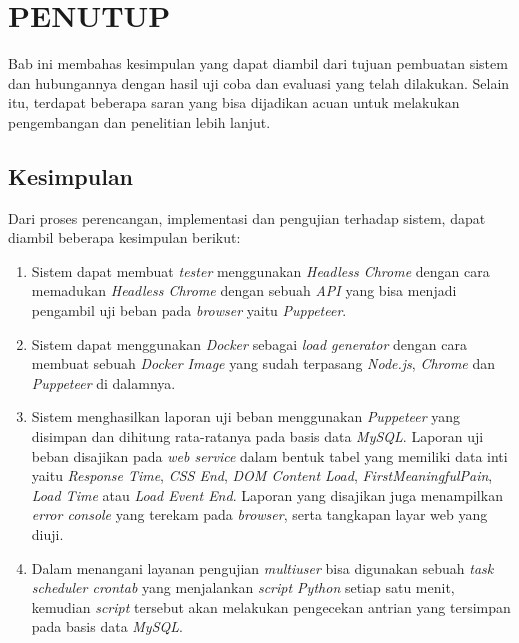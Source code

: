 \chapter{PENUTUP}
    Bab ini membahas kesimpulan yang dapat diambil dari tujuan pembuatan sistem dan hubungannya dengan hasil uji coba dan evaluasi yang telah dilakukan. Selain itu, terdapat beberapa saran yang bisa dijadikan acuan untuk melakukan pengembangan dan penelitian lebih lanjut.
        
	\section{Kesimpulan}
        Dari proses perencangan, implementasi dan pengujian terhadap sistem, dapat diambil beberapa kesimpulan berikut:
        \begin{enumerate}
        	\item Sistem dapat membuat \textit{tester} menggunakan \textit{Headless Chrome} dengan cara memadukan \textit{Headless Chrome} dengan sebuah \textit{API} yang bisa menjadi pengambil uji beban pada \textit{browser} yaitu \textit{Puppeteer}.
        	\item Sistem dapat menggunakan \textit{Docker} sebagai \textit{load generator} dengan cara membuat sebuah \textit{Docker Image} yang sudah terpasang \textit{Node.js}, \textit{Chrome} dan \textit{Puppeteer} di dalamnya.
        	\item Sistem menghasilkan laporan uji beban menggunakan \textit{Puppeteer} yang disimpan dan dihitung rata-ratanya pada basis data \textit{MySQL}. Laporan uji beban disajikan pada \textit{web service} dalam bentuk tabel yang memiliki data inti yaitu \textit{Response Time}, \textit{CSS End}, \textit{DOM Content Load}, \textit{FirstMeaningfulPain}, \textit{Load Time} atau \textit{Load Event End}. Laporan yang disajikan juga menampilkan \textit{error console} yang terekam pada \textit{browser}, serta tangkapan layar web yang diuji.
        	\item Dalam menangani layanan pengujian \textit{multiuser} bisa digunakan sebuah \textit{task scheduler crontab} yang menjalankan \textit{script Python} setiap satu menit, kemudian \textit{script} tersebut akan melakukan pengecekan antrian yang tersimpan pada basis data \textit{MySQL}.
        \end{enumerate}
        
